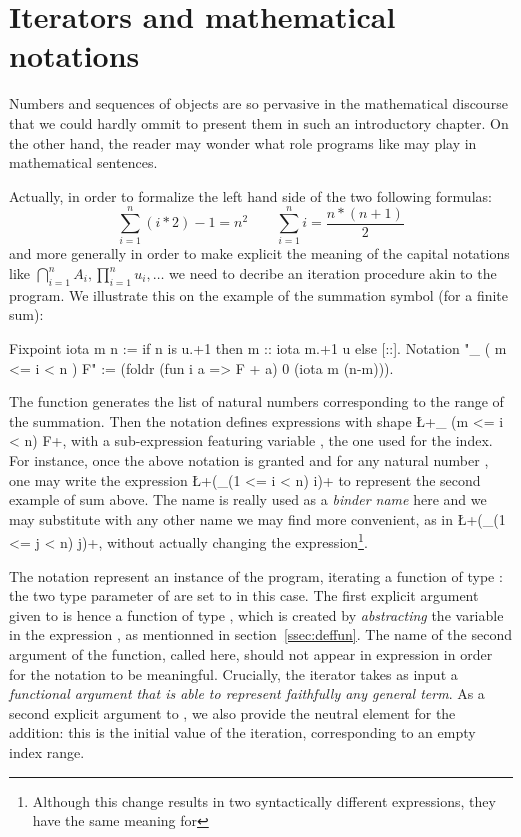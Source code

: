 \section{Iterators and mathematical notations}
\label{sec:bigopnat}

Numbers and sequences of objects are so pervasive in the mathematical
discourse that we could hardly ommit to present them in such an
introductory chapter. On the other hand, the reader may wonder what role
programs like  may play in mathematical sentences.

Actually, in order to formalize the left hand side of the two
following formulas:
$$
\sum_{i=1}^n (i * 2) - 1 = n ^ 2 \qquad
\sum_{i=1}^n i = \frac{n * (n + 1)}{2}
$$
and more generally in order to make explicit the meaning of the capital
notations like $\bigcap_{i=1}^nA_i,
\prod_{i=1}^nu_i, \dots$ we need to decribe an iteration procedure
akin to the  program. We illustrate this on the example of
the summation symbol (for a finite sum):

\begin{coq}{}{}
Fixpoint iota m n := if n is u.+1 then m :: iota m.+1 u else [::].
Notation "\sum_ ( m <= i < n ) F" :=
  (foldr (fun i a => F + a) 0 (iota m (n-m))).
\end{coq}
\index[coq]{\C{\\sum}}

The  function generates the list of natural numbers
corresponding to the range of the summation. Then the notation defines
expressions with shape \L+\sum_ (m <= i < n) F+, with  a
sub-expression featuring variable , the one used for the
index. For instance, once the above notation is granted and for any
natural number , one may write
the \Coq{} expression \L+(\sum_(1 <= i < n) i)+ to represent the
second example of sum above. The name  is really used as a
\emph{binder name} here and we may substitute  with any other
name we may find more convenient, as in \L+(\sum_(1 <= j < n) j)+,
without actually changing the expression\footnote{Although this change
results in two syntactically different expressions, they have the same
meaning for \Coq{}}.

The notation represent an instance of the  program, iterating
a function of type : the two type parameter of
 are set to  in this case. The first explicit
argument given to  is hence a function of
type , which is created by \emph{abstracting} the
variable  in the expression , as mentionned in
section~\ref{ssec:deffun}. The name of the second argument of the
function, called  here, should not appear in expression  in
order for the notation to be meaningful. Crucially, the 
iterator takes as
input a \emph{functional argument that is able to represent faithfully
  any general term}. As a second explicit argument to , we
also provide the neutral element  for the addition: this is the
initial value of the iteration, corresponding to an empty index range.

